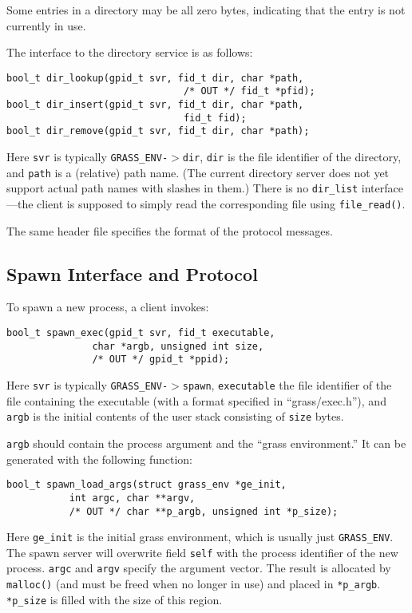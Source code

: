 \documentclass{article}
\begin{document}
Some entries in a directory may be all zero bytes, indicating that
the entry is not currently in use.

The interface to the directory service is as follows:

\begin{verbatim}
bool_t dir_lookup(gpid_t svr, fid_t dir, char *path,
                               /* OUT */ fid_t *pfid);
bool_t dir_insert(gpid_t svr, fid_t dir, char *path,
                               fid_t fid);
bool_t dir_remove(gpid_t svr, fid_t dir, char *path);
\end{verbatim}

Here \texttt{svr} is typically \texttt{GRASS\_ENV-$>$dir},
\texttt{dir} is the file identifier of the directory, and \texttt{path}
is a (relative) path name.  (The current directory server does not yet
support actual path names with slashes in them.)
There is no \texttt{dir\_list} interface---the client is supposed to simply
read the corresponding file using \texttt{file\_read()}.

The same header file specifies the format of the protocol messages.

\subsection{Spawn Interface and Protocol}

To spawn a new process, a client invokes:

\begin{verbatim}
bool_t spawn_exec(gpid_t svr, fid_t executable,
               char *argb, unsigned int size,
               /* OUT */ gpid_t *ppid);
\end{verbatim}

Here \texttt{svr} is typically \texttt{GRASS\_ENV-$>$spawn},
\texttt{executable} the file identifier of the file containing
the executable (with a format specified in ``grass/exec.h''),
and \texttt{argb} is the initial contents of the user stack
consisting of \texttt{size} bytes.

\texttt{argb} should contain the process argument and the
``grass environment.''  It can be generated with the following
function:

\begin{verbatim}
bool_t spawn_load_args(struct grass_env *ge_init,
           int argc, char **argv,
           /* OUT */ char **p_argb, unsigned int *p_size);
\end{verbatim}

Here \texttt{ge\_init} is the initial grass environment, which
is usually just \texttt{GRASS\_ENV}.  The spawn server will overwrite
field \texttt{self} with the process identifier of the new process.
\texttt{argc} and \texttt{argv} specify the argument vector.
The result is allocated by \texttt{malloc()} (and must be freed when
no longer in use) and placed in \texttt{*p\_argb}.  \texttt{*p\_size}
is filled with the size of this region.
\end{document}
